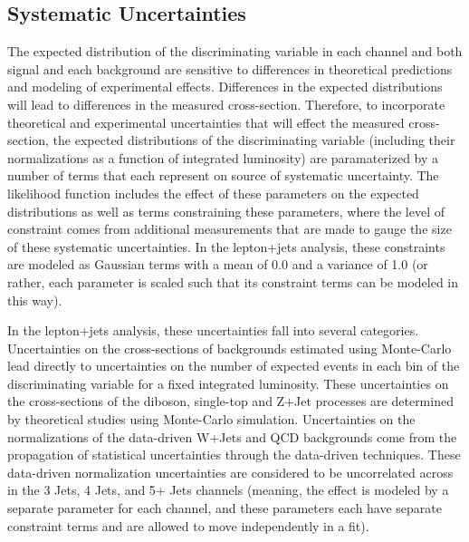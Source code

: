 \subsection{Systematic Uncertainties}

The expected distribution of the discriminating variable in each channel and both signal and each background are sensitive to differences in theoretical predictions and modeling of experimental effects.
Differences in the expected distributions will lead to differences in the measured cross-section.
Therefore, to incorporate theoretical and experimental uncertainties that will effect the measured cross-section, the expected distributions of the discriminating variable (including their normalizations as a function of integrated luminosity) are paramaterized by a number of terms that each represent on source of systematic uncertainty.
The likelihood function includes the effect of these parameters on the expected distributions as well as terms constraining these parameters, where the level of constraint comes from additional measurements that are made to gauge the size of these systematic uncertainties.
In the lepton+jets analysis, these constraints are modeled as Gaussian terms with a mean of 0.0 and a variance of 1.0 (or rather, each parameter is scaled such that its constraint terms can be modeled in this way).

In the lepton+jets analysis, these uncertainties fall into several categories.  
Uncertainties on the cross-sections of backgrounds estimated using Monte-Carlo lead directly to uncertainties on the number of expected events in each bin of the discriminating variable for a fixed integrated luminosity.
These uncertainties on the cross-sections of the diboson, single-top and Z$+$Jet processes are determined by theoretical studies using Monte-Carlo simulation.
Uncertainties on the normalizations of the data-driven W$+$Jets and QCD backgrounds come from the propagation of statistical uncertainties through the data-driven techniques.
These data-driven normalization uncertainties are considered to be uncorrelated across in the 3 Jets, 4 Jets, and 5+ Jets channels (meaning, the effect is modeled by a separate parameter for each channel, and these parameters each have separate constraint terms and are allowed to move independently in a fit).

